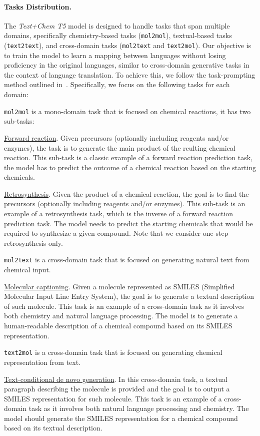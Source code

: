 \documentclass[nohyperref]{article}
\theoremstyle{plain}
\theoremstyle{definition}
\theoremstyle{remark}
\begin{document}
\paragraph{Tasks Distribution.}
The \emph{Text+Chem T5}  model is designed to handle tasks that span multiple domains, specifically chemistry-based tasks (\texttt{mol2mol}), textual-based tasks (\texttt{text2text}), and cross-domain tasks (\texttt{mol2text} and \texttt{text2mol}).
Our objective is to train the model to learn a mapping between languages without losing proficiency in the original languages, similar to cross-domain generative tasks in the context of language translation.
To achieve this, we follow the task-prompting method outlined in~\citet{raffel2020exploring}. Specifically, we focus on the following tasks for each domain:

 \texttt{mol2mol} is a mono-domain task that is focused on chemical reactions, it has two sub-tasks:

\underline{Forward reaction}. Given precursors (optionally including reagents and/or enzymes), the task is to generate the main product of the reulting chemical reaction. This sub-task is a classic example of a forward reaction prediction task, the model has to predict the outcome of a chemical reaction based on the starting chemicals.

\underline{Retrosynthesis}. Given the product of a chemical reaction, the goal is to find the precursors (optionally including reagents and/or enzymes). This sub-task is an example of a retrosynthesis task, which is the inverse of a forward reaction prediction task. The model needs to predict the starting chemicals that would be required to synthesize a given compound.
Note that we consider one-step retrosynthesis only.

 \texttt{mol2text} is a cross-domain task that is focused on generating natural text from chemical input.

\underline{Molecular captioning}. Given a molecule represented as SMILES (Simplified Molecular Input Line Entry System), the goal is to generate a textual description of such molecule. This task is an example of a cross-domain task as it involves both chemistry and natural language processing. The model is to generate a human-readable description of a chemical compound based on its SMILES representation.

 \texttt{text2mol} is a cross-domain task that is focused on generating chemical representation from text.

\underline{Text-conditional de novo generation}. In this cross-domain task, a textual paragraph describing the molecule is provided and the goal is to output a SMILES representation for such molecule. This task is an example of a cross-domain task as it involves both natural language processing and chemistry. The model should generate the SMILES representation for a chemical compound based on its textual description.
\end{document}
